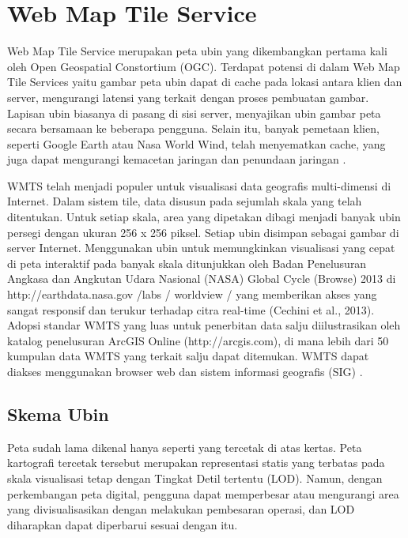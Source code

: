
\section{Web Map Tile Service}
Web Map Tile Service merupakan peta ubin yang dikembangkan pertama kali oleh Open Geospatial Constortium (OGC). 
Terdapat potensi di dalam Web Map Tile Services yaitu gambar peta ubin dapat di cache pada lokasi antara klien dan server, 
mengurangi latensi yang terkait dengan proses pembuatan gambar. Lapisan ubin biasanya di pasang di sisi server, menyajikan 
ubin gambar peta secara bersamaan ke beberapa pengguna. Selain itu, banyak pemetaan klien, seperti Google Earth atau Nasa 
World Wind, telah menyematkan cache, yang juga dapat mengurangi kemacetan jaringan dan penundaan jaringan \cite{garcia2012web}.

WMTS telah menjadi populer untuk visualisasi data geografis multi-dimensi di Internet. Dalam sistem tile, data disusun pada sejumlah 
skala yang telah ditentukan. Untuk setiap skala, area yang dipetakan dibagi menjadi banyak ubin persegi dengan ukuran 256 x 256 piksel.
Setiap ubin disimpan sebagai gambar di server Internet. Menggunakan ubin untuk memungkinkan visualisasi yang cepat di peta interaktif 
pada banyak skala ditunjukkan oleh Badan Penelusuran Angkasa dan Angkutan Udara Nasional (NASA) Global Cycle (Browse) 2013 di
http://earthdata.nasa.gov /labs / worldview / yang memberikan akses yang sangat responsif dan terukur terhadap citra real-time (Cechini
et al., 2013). Adopsi standar WMTS yang luas untuk penerbitan data salju diilustrasikan oleh katalog penelusuran ArcGIS Online 
(http://arcgis.com), di mana lebih dari 50 kumpulan data WMTS yang terkait salju dapat ditemukan. WMTS dapat diakses menggunakan browser 
web dan sistem informasi geografis (SIG) \cite{Kadlec2016Extracting} .


\subsection{Skema Ubin}
Peta sudah lama dikenal hanya seperti yang tercetak di atas kertas. Peta kartografi tercetak tersebut merupakan representasi 
statis yang terbatas pada skala visualisasi tetap dengan Tingkat Detil tertentu (LOD). Namun, dengan perkembangan peta digital, 
pengguna dapat memperbesar atau mengurangi area yang divisualisasikan dengan melakukan pembesaran operasi, dan LOD diharapkan 
dapat diperbarui sesuai dengan itu. 


